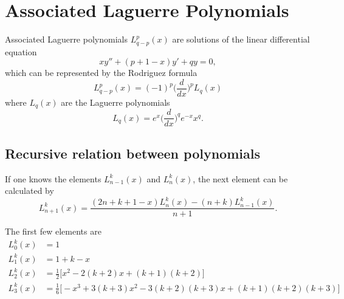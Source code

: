 \chapter{Associated Laguerre Polynomials}
Associated Laguerre polynomials $L_{q-p}^{p}(x)$ are solutions of the linear differential equation 
\begin{equation}
xy''+(p+1-x)y'+qy=0,
\end{equation}
which can be represented by the Rodriguez formula 
\begin{equation}
L_{q-p}^{p}(x)=(-1)^p\Big(\frac{d}{dx}\Big)^pL_q(x)
\end{equation}
where $L_q(x)$ are the Laguerre polynomials 
\begin{equation}
L_q(x)=e^x\Big(\frac{d}{dx}\Big)^qe^{-x}x^q.
\end{equation}

\section{Recursive relation between polynomials}
If one knows the elements $L_{n-1}^k(x)$ and $L_n^k(x)$, the next element can be calculated by
\begin{equation}
L_{n+1}^k(x)=\frac{(2n+k+1-x)L_n^k(x)-(n+k)L_{n-1}^k(x)}{n+1}.
\end{equation}

The first few elements are
\begin{align}
L_0^k(x)&=1\\
L_1^k(x)&=1+k-x\\
L_2^k(x)&=\frac{1}{2}\Big[x^2-2(k+2)x + (k+1)(k+2)\Big]\\
L_3^k(x)&=\frac{1}{6}\Big[-x^3+3(k+3)x^2-3(k+2)(k+3)x+(k+1)(k+2)(k+3)\Big]
\end{align}